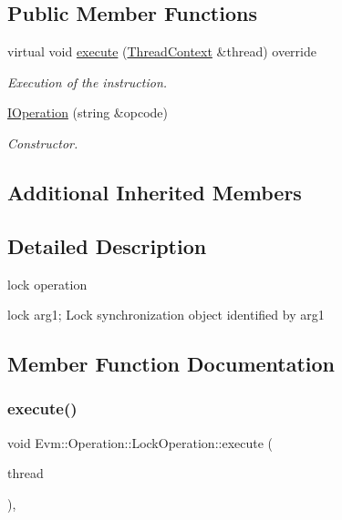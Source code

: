 \subsection*{Public Member Functions}
\begin{DoxyCompactItemize}
\item 
virtual void \mbox{\hyperlink{struct_evm_1_1_operation_1_1_lock_operation_a2ecf10dec9abb8203f56a8f119a97a7f}{execute}} (\mbox{\hyperlink{struct_evm_1_1_thread_context}{Thread\+Context}} \&thread) override
\begin{DoxyCompactList}\small\item\em Execution of the instruction. \end{DoxyCompactList}\item 
\mbox{\hyperlink{struct_evm_1_1_operation_1_1_lock_operation_a65e98ee1b1679e12c1d1dd000ebfe937}{I\+Operation}} (string \&opcode)
\begin{DoxyCompactList}\small\item\em Constructor. \end{DoxyCompactList}\end{DoxyCompactItemize}
\subsection*{Additional Inherited Members}


\subsection{Detailed Description}
lock operation 

lock arg1; Lock synchronization object identified by arg1 

\subsection{Member Function Documentation}
\mbox{\label{struct_evm_1_1_operation_1_1_lock_operation_a2ecf10dec9abb8203f56a8f119a97a7f}} 
\subsubsection{\texorpdfstring{execute()}{execute()}}
{\footnotesize\ttfamily void Evm\+::\+Operation\+::\+Lock\+Operation\+::execute (\begin{DoxyParamCaption}\item[{\mbox{\hyperlink{struct_evm_1_1_thread_context}{Thread\+Context}} \&}]{thread }\end{DoxyParamCaption})\hspace{0.3cm}{\ttfamily [override]}, {\ttfamily [virtual]}}



